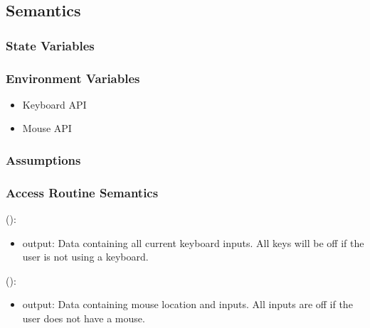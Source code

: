\documentclass[12pt, titlepage]{article}
\begin{document}
\subsection{Semantics}

\subsubsection{State Variables}

\subsubsection{Environment Variables}

\begin{itemize}
\item{Keyboard API}
\item{Mouse API}
\end{itemize}

\subsubsection{Assumptions}


\subsubsection{Access Routine Semantics}

():
\begin{itemize}
\item output: Data containing all current keyboard inputs. All keys will be off if the user is not using a keyboard.
\end{itemize}

():
\begin{itemize}
\item output: Data containing mouse location and inputs. All inputs are off if the user does not have a mouse.
\end{itemize}

%
\end{document}
